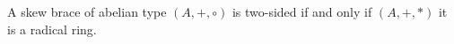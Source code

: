 



\begin{theorem}
\label{thm:radical}
    A skew brace of abelian type $(A,+,\circ)$ 
    is two-sided if and only if $(A,+,*)$ it is a radical ring.
\end{theorem}

